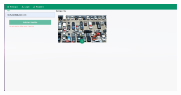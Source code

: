 \begin{anexos}
\begin{figure}
	\begin{figure}[H]
		\centering
		\begin{minipage}[b]{0.68\linewidth}  %
			\centering
			\includegraphics[width=\linewidth]{Graphics/capturas/cars-login-error-landscape.png}
			

\end{minipage}
\end{figure}
\end{figure}
\end{anexos}
